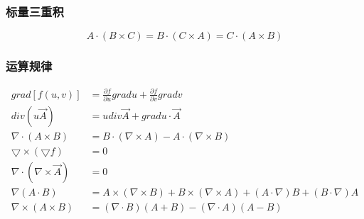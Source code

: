 \documentclass[twocolumn]{ctexart}
\begin{document}
\subsubsection{标量三重积}
\begin{equation}
  A \cdot(B \times C)=B \cdot(C \times A)=C \cdot(A \times B) \tag{1.7}
\end{equation}
\subsubsection{运算规律}

\begin{align}
  grad \left[ f(u,v)\right]& = \frac{\partial f}{\partial u}gradu+ \frac{\partial f}{\partial v}gradv \tag{1.6.a} \\
  div(u \overrightarrow{A})&=udiv \overrightarrow{A}+gradu \cdot \overrightarrow{A} \tag{1.6.b}\\
  \nabla \cdot(A \times B)&=B \cdot(\nabla \times A)-A \cdot(\nabla \times B) \tag{1.6.c}\\
  \bigtriangledown \times (\bigtriangledown f)&=0 \tag{1.6.d}\\
  \nabla \cdot (\nabla \times \vec{A})&=0 \tag{1.6.e}\\
  \nabla(A \cdot B)&=A \times(\nabla \times B)+B \times(\nabla \times A)+(A \cdot \nabla)B+(B \cdot \nabla)A \tag{1.6.f}
\\
\nabla \times(A \times B)&=(\nabla \cdot B)(A+B)-(\nabla \cdot A)(A-B) \tag{1.6.g}
\end{align}
\end{document}
